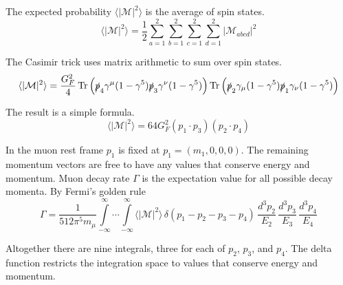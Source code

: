 The expected probability $\langle|\mathcal{M}|^2\rangle$ is the average of spin states.
\begin{equation*}
\langle|\mathcal{M}|^2\rangle=
\frac{1}{2}
\sum_{a=1}^2\sum_{b=1}^2\sum_{c=1}^2\sum_{d=1}^2
|\mathcal{M}_{abcd}|^2
\end{equation*}

The Casimir trick uses matrix arithmetic to sum over spin states.
\begin{equation*}
\langle|\mathcal{M}|^2\rangle
=\frac{G_F^2}{4}
\mathop{\text{Tr}}
\left(\slashed{p}_4\gamma^\mu(1-\gamma^5)\slashed{p}_3\gamma^\nu(1-\gamma^5)\right)
\mathop{\text{Tr}}
\left(\slashed{p}_2\gamma_\mu(1-\gamma^5)\slashed{p}_1\gamma_\nu(1-\gamma^5)\right)
\end{equation*}

The result is a simple formula.
\begin{equation*}
\langle|\mathcal{M}|^2\rangle=64G_F^2(p_1\cdot p_3)(p_2\cdot p_4)
\end{equation*}

\iffalse
In component notation
\begin{equation*}
\langle|\mathcal{M}|^2\rangle=64G_F^2
({p_1}^\mu \, g_{\mu\nu} \, {p_3}^\nu))
({p_2}^\rho \, g_{\rho\sigma} \, {p_4}^\sigma)
\end{equation*}
where
\begin{equation*}
g_{\mu\nu}=g_{\rho\sigma}=\begin{pmatrix}
1 & 0 & 0 & 0\\
0 & -1 & 0 & 0\\
0 & 0 & -1 & 0\\
0 & 0 & 0 & -1
\end{pmatrix}
\end{equation*}
\fi

In the muon rest frame $p_1$ is fixed at $p_1=(m_1,0,0,0)$.
The remaining momentum vectors are free to have any values that conserve energy and momentum.
Muon decay rate $\Gamma$ is the expectation value for all possible decay momenta.
By Fermi's golden rule
\begin{equation*}
\Gamma=\frac{1}{512\pi^5m_\mu}
\int\limits_{-\infty}^\infty \cdots \int\limits_{-\infty}^\infty
\langle|\mathcal{M}|^2\rangle
\,\delta(p_1-p_2-p_3-p_4)
\,\frac{d^3p_2}{E_2}\,\frac{d^3p_3}{E_3}\,\frac{d^3p_4}{E_4}
\end{equation*}

Altogether there are nine integrals, three for each of $p_2$, $p_3$, and $p_4$.
The delta function restricts the integration space to values that conserve energy and momentum.

